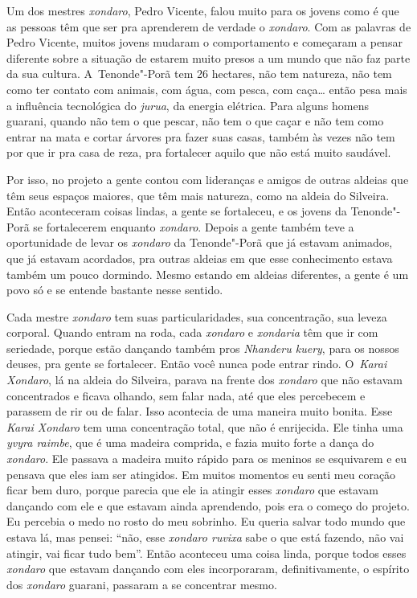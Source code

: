 Um dos mestres \emph{xondaro}, Pedro Vicente, falou muito para os jovens como é
que as pessoas têm que ser pra aprenderem de verdade o \emph{xondaro}. Com as
palavras de Pedro Vicente, muitos jovens mudaram o comportamento e
começaram a pensar diferente sobre a situação de estarem muito presos a
um mundo que não faz parte da sua cultura. A~Tenonde"-Porã tem 26
hectares, não tem natureza, não tem como ter contato com animais, com
água, com pesca, com caça\ldots{} então pesa mais a influência tecnológica
do \emph{jurua}, da energia elétrica. Para alguns homens guarani, quando não
tem o que pescar, não tem o que caçar e não tem como entrar na mata e
cortar árvores pra fazer suas casas, também às vezes não tem por que ir
pra casa de reza, pra fortalecer aquilo que não está muito saudável.

Por isso, no projeto a gente contou com lideranças e amigos de outras
aldeias que têm seus espaços maiores, que têm mais natureza, como na
aldeia do Silveira. Então aconteceram coisas lindas, a gente se
fortaleceu, e os jovens da Tenonde"-Porã se fortalecerem enquanto
\emph{xondaro}. Depois a gente também teve a oportunidade de levar os \emph{xondaro}
da Tenonde"-Porã que já estavam animados, que já estavam acordados, pra
outras aldeias em que esse conhecimento estava também um pouco
dormindo. Mesmo estando em aldeias diferentes, a gente é um povo só e
se entende bastante nesse sentido.

Cada mestre \emph{xondaro} tem suas particularidades, sua concentração, sua
leveza corporal. Quando entram na roda, cada \emph{xondaro} e \emph{xondaria} têm que
ir com seriedade, porque estão dançando também pros \emph{Nhanderu kuery}, para
os nossos deuses, pra gente se fortalecer. Então você nunca pode entrar
rindo. O~\emph{Karai Xondaro}, lá na aldeia do Silveira, parava na frente dos
\emph{xondaro} que não estavam concentrados e ficava olhando, sem falar nada,
até que eles percebecem e parassem de rir ou de falar. Isso acontecia
de uma maneira muito bonita. Esse \emph{Karai Xondaro} tem uma concentração
total, que não é enrijecida. Ele tinha uma \emph{yvyra raimbe}, que é uma
madeira comprida, e fazia muito forte a dança do \emph{xondaro}. Ele passava a
madeira muito rápido para os meninos se esquivarem e eu pensava que
eles iam ser atingidos. Em muitos momentos eu senti meu coração ficar
bem duro, porque parecia que ele ia atingir esses \emph{xondaro} que estavam
dançando com ele e que estavam ainda aprendendo, pois era o começo do
projeto. Eu percebia o medo no rosto do meu sobrinho. Eu queria salvar
todo mundo que estava lá, mas pensei: ``não, esse \emph{xondaro ruvixa} sabe o
que está fazendo, não vai atingir, vai ficar tudo bem''. Então aconteceu
uma coisa linda, porque todos esses \emph{xondaro} que estavam dançando com
eles incorporaram, definitivamente, o espírito dos \emph{xondaro} guarani,
passaram a se concentrar mesmo.

